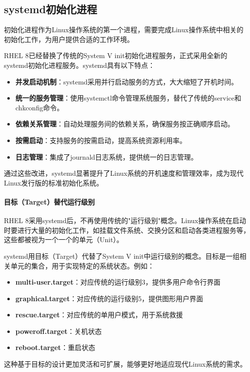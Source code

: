 \documentclass[12pt,UTF8]{ctexbook}
\begin{document}
\subsection{systemd初始化进程}
初始化进程作为Linux操作系统的第一个进程，需要完成Linux操作系统中相关的初始化工作，为用户提供合适的工作环境。

RHEL 8已经替换了传统的System V init初始化进程服务，正式采用全新的systemd初始化进程服务。systemd具有以下特点：

\begin{itemize}
    \item \textbf{并发启动机制}：systemd采用并行启动服务的方式，大大缩短了开机时间。
    \item \textbf{统一的服务管理}：使用systemctl命令管理系统服务，替代了传统的service和chkconfig命令。
    \item \textbf{依赖关系管理}：自动处理服务间的依赖关系，确保服务按正确顺序启动。
    \item \textbf{按需启动}：支持服务的按需启动，提高系统资源利用率。
    \item \textbf{日志管理}：集成了journald日志系统，提供统一的日志管理。
\end{itemize}

通过这些改进，systemd显著提升了Linux系统的开机速度和管理效率，成为现代Linux发行版的标准初始化系统。

\paragraph{目标（Target）替代运行级别}
RHEL 8采用systemd后，不再使用传统的"运行级别"概念。Linux操作系统在启动时要进行大量的初始化工作，如挂载文件系统、交换分区和启动各类进程服务等，这些都被视为一个一个的单元（Unit）。

systemd用目标（Target）代替了System V init中运行级别的概念。目标是一组相关单元的集合，用于实现特定的系统状态。例如：
\begin{itemize}
    \item \textbf{multi-user.target}：对应传统的运行级别3，提供多用户命令行界面
    \item \textbf{graphical.target}：对应传统的运行级别5，提供图形用户界面
    \item \textbf{rescue.target}：对应传统的单用户模式，用于系统救援
    \item \textbf{poweroff.target}：关机状态
    \item \textbf{reboot.target}：重启状态
\end{itemize}

这种基于目标的设计更加灵活和可扩展，能够更好地适应现代Linux系统的需求。
\end{document}
